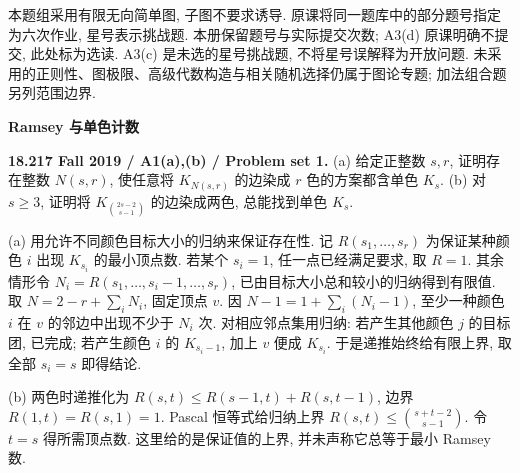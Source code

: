 \label{ch:assessment18217}
本题组采用有限无向简单图, 子图不要求诱导. 原课将同一题库中的部分题号指定为六次作业, 星号表示挑战题. 本册保留题号与实际提交次数; A3(d) 原课明确不提交, 此处标为选读. A3(c) 是未选的星号挑战题, 不将星号误解释为开放问题. 未采用的正则性、图极限、高级代数构造与相关随机选择仍属于图论专题; 加法组合题另列范围边界.

\par\medskip\noindent\textbf{Ramsey 与单色计数}\par
\begin{exercise}\label{mit:18217-a1}
\textbf{18.217 Fall 2019 / A1(a),(b) / Problem set 1.}
(a) 给定正整数 $s,r$, 证明存在整数 $N(s,r)$, 使任意将 $K_{N(s,r)}$ 的边染成 $r$ 色的方案都含单色 $K_s$.
(b) 对 $s\ge3$, 证明将 $K_{\binom{2s-2}{s-1}}$ 的边染成两色, 总能找到单色 $K_s$.
\end{exercise}
\begin{solution}
(a) 用允许不同颜色目标大小的归纳来保证存在性. 记 $R(s_1,\ldots,s_r)$ 为保证某种颜色 $i$ 出现 $K_{s_i}$ 的最小顶点数. 若某个 $s_i=1$, 任一点已经满足要求, 取 $R=1$. 其余情形令 $N_i=R(s_1,\ldots,s_i-1,\ldots,s_r)$, 已由目标大小总和较小的归纳得到有限值. 取 $N=2-r+\sum_iN_i$, 固定顶点 $v$. 因 $N-1=1+\sum_i(N_i-1)$, 至少一种颜色 $i$ 在 $v$ 的邻边中出现不少于 $N_i$ 次. 对相应邻点集用归纳: 若产生其他颜色 $j$ 的目标团, 已完成; 若产生颜色 $i$ 的 $K_{s_i-1}$, 加上 $v$ 便成 $K_{s_i}$. 于是递推始终给有限上界, 取全部 $s_i=s$ 即得结论.

(b) 两色时递推化为 $R(s,t)\le R(s-1,t)+R(s,t-1)$, 边界 $R(1,t)=R(s,1)=1$. Pascal 恒等式给归纳上界 $R(s,t)\le\binom{s+t-2}{s-1}$. 令 $t=s$ 得所需顶点数. 这里给的是保证值的上界, 并未声称它总等于最小 Ramsey 数.
\end{solution}

